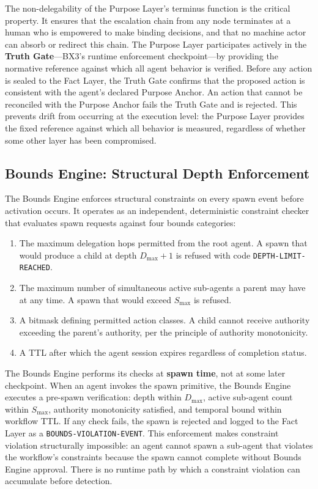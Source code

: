 The non-delegability of the Purpose Layer's terminus function is the critical property. It ensures that the escalation chain from any node terminates at a human who is empowered to make binding decisions, and that no machine actor can absorb or redirect this chain. The Purpose Layer participates actively in the \textbf{Truth Gate}---BX3's runtime enforcement checkpoint---by providing the normative reference against which all agent behavior is verified. Before any action is sealed to the Fact Layer, the Truth Gate confirms that the proposed action is consistent with the agent's declared Purpose Anchor. An action that cannot be reconciled with the Purpose Anchor fails the Truth Gate and is rejected. This prevents drift from occurring at the execution level: the Purpose Layer provides the fixed reference against which all behavior is measured, regardless of whether some other layer has been compromised.

\subsection{Bounds Engine: Structural Depth Enforcement}

The Bounds Engine enforces structural constraints on every spawn event before activation occurs. It operates as an independent, deterministic constraint checker that evaluates spawn requests against four bounds categories:

\begin{enumerate}
  \item[\textbf{Depth Bound ($D_{\max}$):}] The maximum delegation hops permitted from the root agent. A spawn that would produce a child at depth $D_{\max} + 1$ is refused with code \texttt{DEPTH-LIMIT-REACHED}.
  \item[\textbf{Scope Bound ($S_{\max}$):}] The maximum number of simultaneous active sub-agents a parent may have at any time. A spawn that would exceed $S_{\max}$ is refused.
  \item[\textbf{Authority Bound:}] A bitmask defining permitted action classes. A child cannot receive authority exceeding the parent's authority, per the principle of authority monotonicity.
  \item[\textbf{Temporal Bound ($T_{\text{bounds}}$):}] A TTL after which the agent session expires regardless of completion status.
\end{enumerate}

The Bounds Engine performs its checks at \textbf{spawn time}, not at some later checkpoint. When an agent invokes the spawn primitive, the Bounds Engine executes a pre-spawn verification: depth within $D_{\max}$, active sub-agent count within $S_{\max}$, authority monotonicity satisfied, and temporal bound within workflow TTL. If any check fails, the spawn is rejected and logged to the Fact Layer as a \texttt{BOUNDS-VIOLATION-EVENT}. This enforcement makes constraint violation structurally impossible: an agent cannot spawn a sub-agent that violates the workflow's constraints because the spawn cannot complete without Bounds Engine approval. There is no runtime path by which a constraint violation can accumulate before detection.

